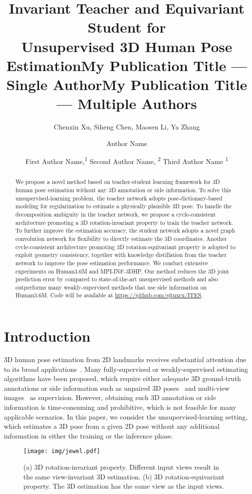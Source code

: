 \documentclass[letterpaper]{article} \usepackage{aaai21}  \usepackage{times}  \usepackage{helvet} \usepackage{courier}  \usepackage[hyphens]{url}  \usepackage{graphicx} \urlstyle{rm} \def\UrlFont{\rm}  \usepackage{natbib}  \usepackage{caption} \frenchspacing  \setlength{\pdfpagewidth}{8.5in}  \setlength{\pdfpageheight}{11in}
\title{Invariant Teacher and Equivariant Student for \\ Unsupervised 3D Human Pose Estimation}
\author{
Chenxin Xu,
    Siheng Chen\textsuperscript{\Letter},
    Maosen Li,
    Ya Zhang\textsuperscript{\Letter}
    \\
}
\title{My Publication Title --- Single Author}
\author {
Author Name \\
}
\title{My Publication Title --- Multiple Authors}
\author {
First Author Name,\textsuperscript{\rm 1}
    Second Author Name, \textsuperscript{\rm 2}
    Third Author Name \textsuperscript{\rm 1} \\
}
\begin{document}
\maketitle

\begin{abstract}
We propose a novel method based on teacher-student learning framework for 3D human pose estimation without any 3D annotation or side information.
To solve this unsupervised-learning problem, the teacher network adopts pose-dictionary-based modeling for regularization to estimate a physically plausible 3D pose. To handle the decomposition ambiguity in the teacher network, we propose a cycle-consistent architecture promoting a 3D rotation-invariant property to train the teacher network.
To further improve the estimation accuracy, the student network adopts a novel graph convolution network for flexibility to directly estimate the 3D coordinates. Another cycle-consistent architecture promoting 3D rotation-equivariant property is adopted to exploit geometry consistency, together with knowledge distillation from the teacher network to improve the pose estimation performance.
We conduct extensive experiments on Human3.6M and MPI-INF-3DHP. Our method reduces the 3D joint prediction error by  compared to state-of-the-art unsupervised methods and also outperforms many weakly-supervised methods that use side information on Human3.6M.  Code will be available at \url{https://github.com/sjtuxcx/ITES}.
\end{abstract}

\section{Introduction}
3D human pose estimation from 2D landmarks receives substantial attention due to its broad applications~\cite{Li_cvpr_2019,Li_2020_CVPR}.
Many fully-supervised or weakly-supervised estimating algorithms have been proposed, which require either adequate 3D ground-truth annotations or side information such as unpaired 3D poses{~\cite{tung2017adversarial}} and multi-view images{~\cite{kocabas2019self}} as supervision.
However, obtaining such 3D annotation or side information is time-consuming and prohibitive, which is not feasible for many applicable scenarios. 
In this paper, we consider the unsupervised-learning setting, which estimates a 3D pose from a given 2D pose without any additional information in either the training or the inference phase.

\begin{figure}[t] 
\centering
\texttt{[image: img/jewel.pdf]} 
\vspace{-20pt}
\caption{\small (a) 3D rotation-invariant property. Different input views result in the same view-invariant 3D estimation.
(b) 3D rotation-equivariant property. The 3D estimation has the same view as the input views.
} 
\label{fig:jewel}
\vspace{-5mm}
\end{figure}
\end{document}

